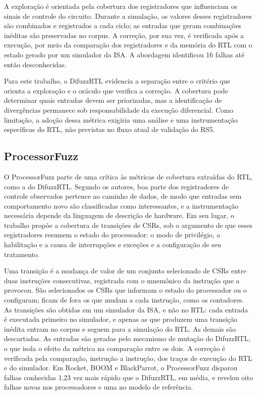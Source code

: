 A exploração é orientada pela cobertura dos registradores que influenciam os sinais de controle do circuito. Durante a simulação, os valores desses registradores são combinados e registrados a cada ciclo; as entradas que geram combinações inéditas são preservadas no corpus. A correção, por sua vez, é verificada após a execução, por meio da comparação dos registradores e da memória do RTL com o estado gerado por um simulador da ISA. A abordagem identificou 16 falhas até então desconhecidas.

Para este trabalho, o DifuzzRTL evidencia a separação entre o critério que orienta a exploração e o oráculo que verifica a correção. A cobertura pode determinar quais entradas devem ser priorizadas, mas a identificação de divergências permanece sob responsabilidade da execução diferencial. Como limitação, a adoção dessa métrica exigiria uma análise e uma instrumentação específicas do RTL, não previstas no fluxo atual de validação do RS5.

\subsection{ProcessorFuzz}\label{sec:processorfuzz}

O ProcessorFuzz \citep{Canakci:2023:ProcessorFuzz} parte de uma crítica às métricas de cobertura extraídas do RTL, como a do DifuzzRTL. Segundo os autores, boa parte dos registradores de controle observados pertence ao caminho de dados, de modo que entradas sem comportamento novo são classificadas como interessantes, e a instrumentação necessária depende da linguagem de descrição de hardware. Em seu lugar, o trabalho propõe a cobertura de transições de CSRs, sob o argumento de que esses registradores resumem o estado do processador: o modo de privilégio, a habilitação e a causa de interrupções e exceções e a configuração de seu tratamento.

Uma transição é a mudança de valor de um conjunto selecionado de CSRs entre duas instruções consecutivas, registrada com o mnemônico da instrução que a provocou. São selecionados os CSRs que informam o estado do processador ou o configuram; ficam de fora os que mudam a cada instrução, como os contadores. As transições são obtidas em um simulador da ISA, e não no RTL: cada entrada é executada primeiro no simulador, e apenas as que produzem uma transição inédita entram no corpus e seguem para a simulação do RTL. As demais são descartadas. As entradas são geradas pelo mecanismo de mutação do DifuzzRTL, o que isola o efeito da métrica na comparação entre os dois. A correção é verificada pela comparação, instrução a instrução, dos traços de execução do RTL e do simulador. Em Rocket, BOOM e BlackParrot, o ProcessorFuzz disparou falhas conhecidas 1,23 vez mais rápido que o DifuzzRTL, em média, e revelou oito falhas novas nos processadores e uma no modelo de referência.

